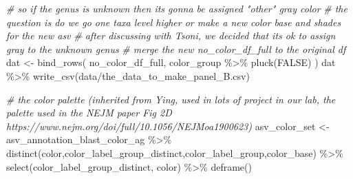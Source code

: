 \documentclass[
]{book}
\newenvironment{Shaded}{\begin{snugshade}}{\end{snugshade}}
\newcommand{\AttributeTok}[1]{\textcolor[rgb]{0.77,0.63,0.00}{#1}}
\newcommand{\CommentTok}[1]{\textcolor[rgb]{0.56,0.35,0.01}{\textit{#1}}}
\newcommand{\FunctionTok}[1]{\textcolor[rgb]{0.00,0.00,0.00}{#1}}
\newcommand{\NormalTok}[1]{#1}
\newcommand{\OtherTok}[1]{\textcolor[rgb]{0.56,0.35,0.01}{#1}}
\newcommand{\SpecialCharTok}[1]{\textcolor[rgb]{0.00,0.00,0.00}{#1}}
\newcommand{\StringTok}[1]{\textcolor[rgb]{0.31,0.60,0.02}{#1}}
\begin{document}
\begin{Shaded}
\begin{Highlighting}[]
\CommentTok{\# so if the genus is unknown then it\textquotesingle{}s gonna be assigned "other" gray color  }
\CommentTok{\# the question is do we go one taxa level higher or make a new color base and shades for the new asv}
\CommentTok{\# after discussing with Tsoni, we decided that it\textquotesingle{}s ok to assign gray to the unknown genus }
\CommentTok{\# merge the new no\_color\_df\_full to the original df}
\NormalTok{dat }\OtherTok{\textless{}{-}} \FunctionTok{bind\_rows}\NormalTok{(}
\NormalTok{  no\_color\_df\_full,}
\NormalTok{  color\_group }\SpecialCharTok{\%\textgreater{}\%} 
    \FunctionTok{pluck}\NormalTok{(}\StringTok{\textquotesingle{}FALSE\textquotesingle{}}\NormalTok{)}
\NormalTok{)   }
\NormalTok{dat }\SpecialCharTok{\%\textgreater{}\%}  \FunctionTok{write\_csv}\NormalTok{(}\StringTok{\textquotesingle{}data/the\_data\_to\_make\_panel\_B.csv\textquotesingle{}}\NormalTok{)}
\end{Highlighting}
\end{Shaded}

\begin{Shaded}
\begin{Highlighting}[]
\CommentTok{\# the color palette (inherited from Ying, used in lots of project in our lab, the palette used in the NEJM paper Fig 2D https://www.nejm.org/doi/full/10.1056/NEJMoa1900623)}
\NormalTok{asv\_color\_set }\OtherTok{\textless{}{-}}\NormalTok{ asv\_annotation\_blast\_color\_ag }\SpecialCharTok{\%\textgreater{}\%} 
  \FunctionTok{distinct}\NormalTok{(color,color\_label\_group\_distinct,color\_label\_group,color\_base) }\SpecialCharTok{\%\textgreater{}\%} 
  \FunctionTok{select}\NormalTok{(color\_label\_group\_distinct, color) }\SpecialCharTok{\%\textgreater{}\%} 
  \FunctionTok{deframe}\NormalTok{()}
\end{Highlighting}
\end{Shaded}

\begin{Shaded}
\end{Shaded}
\end{document}

